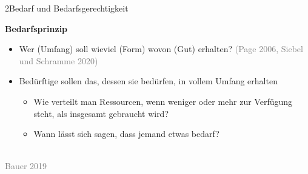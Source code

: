 \documentclass[xcolor=table,9pt,aspectratio=169]{beamer}
\begin{document}
\begin{frame}{\vspace*{10mm}2\hspace*{1em}Bedarf und Bedarfsgerechtigkeit}
\begin{multicols}{2}
   \textbf{Bedarfsprinzip}\\
   \medskip
   \begin{itemize}
      \item Wer (Umfang) soll wieviel (Form) wovon (Gut) erhalten? \textcolor{gray}{(Page 2006, Siebel und Schramme 2020)}
      \item Bedürftige sollen das, dessen sie bedürfen, in vollem Umfang erhalten
      \begin{itemize}
         \item Wie verteilt man Ressourcen, wenn weniger oder mehr zur Verfügung steht, als insgesamt gebraucht wird?
         \item Wann lässt sich sagen, dass jemand etwas bedarf?
      \end{itemize}
   \end{itemize}
   \vfill
   \begin{center}
      \\
      \textcolor{gray}{Bauer 2019}
   \end{center}
\end{multicols}
\end{frame}
\end{document}
